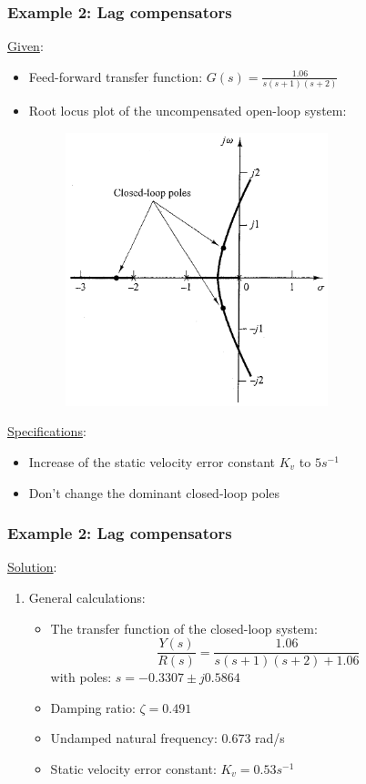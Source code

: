 \begin{frame}
	\frametitle{Example 2: Lag compensators}
	\underline{Given}:
	\begin{itemize}
		\item Feed-forward transfer function: $G(s)=\frac{1.06}{s(s+1)(s+2)}$
		\item Root locus plot of the uncompensated open-loop system:
		\begin{figure}
			\centering
			\includegraphics[width=0.3\linewidth]{Ex2_rootlocus}
		\end{figure}
	\end{itemize}
	\underline{Specifications}:
	\begin{itemize}
		\item Increase of the static velocity error constant $K_v$ to $5s^{-1}$
		\item Don't change the dominant closed-loop poles
	\end{itemize}
\end{frame}

\begin{frame}
	\frametitle{Example 2: Lag compensators}
	\underline{Solution}:
	\begin{enumerate}
		\item General calculations:
		\begin{itemize}
			\item The transfer function of the closed-loop system:
			$$\frac{Y(s)}{R(s)}=\frac{1.06}{s(s+1)(s+2)+1.06}$$ with poles: $s=-0.3307\pm j0.5864$
			\item Damping ratio: $\zeta=0.491$
			\item Undamped natural frequency: 0.673 rad/s
			\item Static velocity error constant: $K_v=0.53s^{-1}$
		\end{itemize}
	\end{enumerate}
\end{frame}

